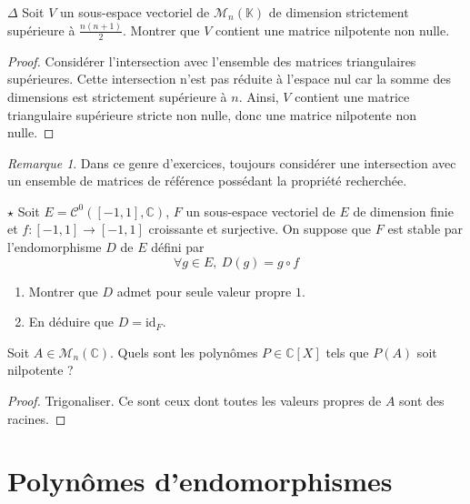 \documentclass[french,a4paper]{article}
\newcommand{\C}{\mathbb{C}}
\newcommand{\K}{\mathbb{K}}
\theoremstyle{plain}
\theoremstyle{definition}
\theoremstyle{remark}
\newtheorem*{rmq}{Remarque}
\begin{document}
\begin{ex}{$\Delta$}
	Soit $V$ un sous-espace vectoriel de $\mathcal{M}_n(\K)$ de dimension strictement supérieure à $\displaystyle\frac{n(n+1)}{2}$. Montrer que $V$ contient une matrice nilpotente non nulle.
\end{ex}
\begin{proof}
	Considérer l'intersection avec l'ensemble des matrices triangulaires supérieures. Cette intersection n'est pas réduite à l'espace nul car la somme des dimensions est strictement supérieure à $n$. Ainsi, $V$ contient une matrice triangulaire supérieure stricte non nulle, donc une matrice nilpotente non nulle.
\end{proof}
\begin{rmq}
	Dans ce genre d'exercices, toujours considérer une intersection avec un ensemble de matrices de référence possédant la propriété recherchée.
\end{rmq}

\begin{ex}{$\star$}
	Soit $E=\mathcal{C}^0([-1,1],\C)$, $F$ un sous-espace vectoriel de $E$ de dimension finie et $f:[-1,1]\to[-1,1]$ croissante et surjective. On suppose que $F$ est stable par l'endomorphisme $D$ de $E$ défini par $$\forall g\in E,\ D(g)=g\circ f$$
	\begin{enumerate}
		\item Montrer que $D$ admet pour seule valeur propre $1$.
		\item En déduire que $D=\text{id}_F$.
	\end{enumerate}
\end{ex}

\begin{ex}{}
	Soit $A\in\mathcal{M}_n(\C)$. Quels sont les polynômes $P\in\C[X]$ tels que $P(A)$ soit nilpotente ?
\end{ex}
\begin{proof}
	Trigonaliser. Ce sont ceux dont toutes les valeurs propres de $A$ sont des racines.
\end{proof}

\section{Polynômes d'endomorphismes}
\end{document}
